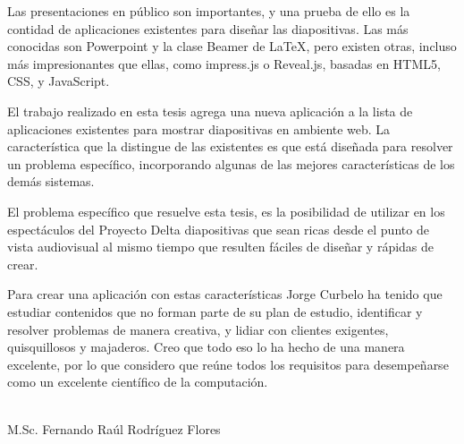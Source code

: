 
\begin{opinion}

    Las presentaciones en público son importantes, y una prueba de ello es la contidad de aplicaciones existentes para diseñar las diapositivas.  Las más conocidas son Powerpoint y la clase Beamer de \LaTeX{}, pero existen otras, incluso más impresionantes que ellas, como impress.js o Reveal.js, basadas en HTML5, CSS, y JavaScript.   

    El trabajo realizado en esta tesis agrega una nueva aplicación a la lista de aplicaciones existentes para mostrar diapositivas en ambiente web.  La característica que la distingue de las existentes es que está diseñada para resolver un problema específico, incorporando algunas de las mejores características de los demás sistemas.

    El problema específico que resuelve esta tesis, es la posibilidad de utilizar en los espectáculos del Proyecto Delta diapositivas que sean ricas desde el punto de vista audiovisual al mismo tiempo que resulten fáciles de diseñar y rápidas de crear.

    Para crear una aplicación con estas características Jorge Curbelo ha tenido que estudiar contenidos que no forman parte de su plan de estudio, identificar y resolver problemas de manera creativa, y lidiar con clientes exigentes, quisquillosos y majaderos.  Creo que todo eso lo ha hecho de una manera excelente, por lo que considero que reúne todos los requisitos para desempeñarse como un excelente científico de la computación.


\vfill
\begin{flushright}
\underline{\hspace{186pt}}\hfill \\
M.Sc. Fernando Ra\'ul Rodríguez Flores
\end{flushright}
\end{opinion}
